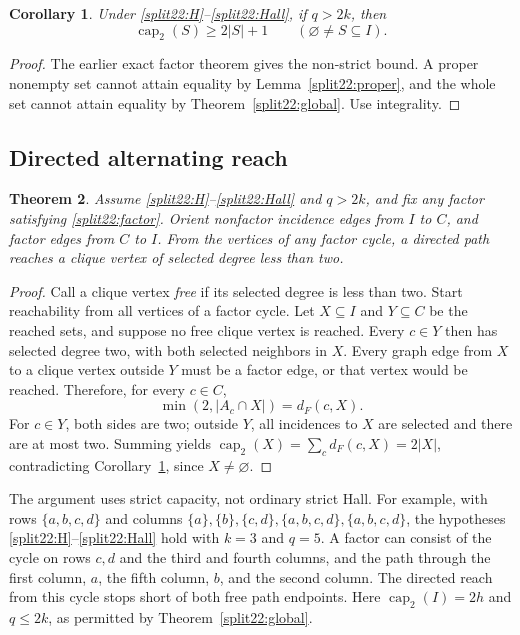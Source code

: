 \documentclass[11pt,a4paper]{article}
\newtheorem{theorem}{Theorem}[section]
\newtheorem{corollary}[theorem]{Corollary}
\theoremstyle{definition}\newtheorem{definition}[theorem]{Definition}
\theoremstyle{remark}\newtheorem{remark}[theorem]{Remark}
\begin{document}
\begin{corollary}\label{split22:strictcap}
Under \eqref{split22:H}--\eqref{split22:Hall}, if $q>2k$, then
\[
 \operatorname{cap}_2(S)\geq2|S|+1\qquad(\varnothing\ne S\subseteq I).
\]
\end{corollary}
\begin{proof}
The earlier exact factor theorem gives the non-strict bound. A proper
nonempty set cannot attain equality by Lemma~\ref{split22:proper}, and the whole
set cannot attain equality by Theorem~\ref{split22:global}. Use integrality.
\end{proof}

\subsection{Directed alternating reach}

\begin{theorem}\label{split22:reach}
Assume \eqref{split22:H}--\eqref{split22:Hall} and $q>2k$, and fix any factor satisfying
\eqref{split22:factor}. Orient nonfactor incidence edges from $I$ to $C$, and
factor edges from $C$ to $I$. From the vertices of any factor cycle, a
directed path reaches a clique vertex of selected degree less than two.
\end{theorem}
\begin{proof}
Call a clique vertex \emph{free} if its selected degree is less than two.
Start reachability from all vertices of a factor cycle. Let $X\subseteq I$
and $Y\subseteq C$ be the reached sets, and suppose no free clique vertex
is reached. Every $c\in Y$ then has selected degree two, with both selected
neighbors in $X$. Every graph edge from $X$ to a clique vertex outside $Y$
must be a factor edge, or that vertex would be reached. Therefore, for
every $c\in C$,
\[
 \min(2,|A_c\cap X|)=d_F(c,X).
\]
For $c\in Y$, both sides are two; outside $Y$, all incidences to $X$ are
selected and there are at most two. Summing yields
$\operatorname{cap}_2(X)=\sum_c d_F(c,X)=2|X|$, contradicting
Corollary~\ref{split22:strictcap}, since $X\ne\varnothing$.
\end{proof}

The argument uses strict capacity, not ordinary strict Hall. For example,
with rows $\{a,b,c,d\}$ and columns
$\{a\},\{b\},\{c,d\},\{a,b,c,d\},\{a,b,c,d\}$, the hypotheses
\eqref{split22:H}--\eqref{split22:Hall} hold with $k=3$ and $q=5$. A factor can consist
of the cycle on rows $c,d$ and the third and fourth columns, and the path
through the first column, $a$, the fifth column, $b$, and the second column.
The directed reach from this cycle stops short of both free path endpoints.
Here $\operatorname{cap}_2(I)=2h$ and $q\leq2k$, as permitted by Theorem~\ref{split22:global}.
\end{document}
